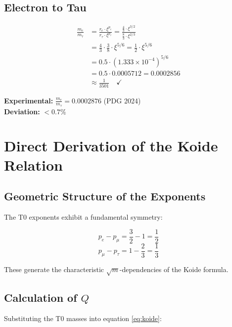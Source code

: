 	\subsection{Electron to Tau}
	
	\begin{beweis}
		\begin{align}
			\frac{m_e}{m_\tau} &= \frac{r_e \cdot \xi^{p_e}}{r_\tau \cdot \xi^{p_\tau}} = \frac{\frac{4}{3} \cdot \xi^{3/2}}{\frac{8}{3} \cdot \xi^{2/3}} \\
			&= \frac{4}{3} \cdot \frac{3}{8} \cdot \xi^{5/6} = \frac{1}{2} \cdot \xi^{5/6} \\
			&= 0.5 \cdot (1.333 \times 10^{-4})^{5/6} \\
			&= 0.5 \cdot 0.0005712 = 0.0002856 \\
			&\approx \frac{1}{3501} \quad \checkmark
		\end{align}
		
		\textbf{Experimental:} $\frac{m_e}{m_\tau} = 0.0002876$ (PDG 2024)\\
		\textbf{Deviation:} $< 0.7\%$
	\end{beweis}
	
	\section{Direct Derivation of the Koide Relation}
	
	\subsection{Geometric Structure of the Exponents}
	
	The T0 exponents exhibit a fundamental symmetry:
	
	\begin{equation}
		p_e - p_\mu = \frac{3}{2} - 1 = \frac{1}{2}
	\end{equation}
	\begin{equation}
		p_\mu - p_\tau = 1 - \frac{2}{3} = \frac{1}{3}
	\end{equation}
	
	These generate the characteristic $\sqrt{m}$-dependencies of the Koide formula.
	
	\subsection{Calculation of $Q$}
	
	Substituting the T0 masses into equation \eqref{eq:koide}:
	
